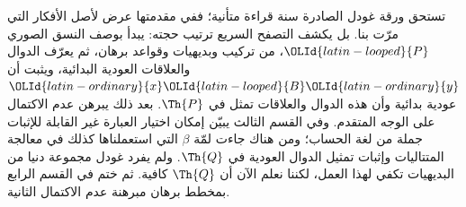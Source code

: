 \documentclass[../../../include/open-logic-section]{subfiles}
\begin{document}


تستحق ورقة غودل الصادرة سنة  قراءة متأنية؛ ففي مقدمتها عرض
لأصل الأفكار التي مرّت بنا. بل يكشف التصفح السريع ترتيب حجته:
يبدأ بوصف النسق الصوري $\OLId{latin-looped}{P}$، من تركيب وبديهيات وقواعد برهان،
ثم يعرّف الدوال والعلاقات العودية البدائية، ويثبت أن $\OLId{latin-ordinary}{x} \OLId{latin-looped}{B} \OLId{latin-ordinary}{y}$
عودية بدائية وأن هذه الدوال والعلاقات تمثل في $\Th{P}$.
بعد ذلك يبرهن عدم الاكتمال على الوجه المتقدم. وفي القسم الثالث
يبيّن إمكان اختيار العبارة غير القابلة للإثبات جملة من لغة الحساب؛
ومن هناك جاءت لمّة $\beta$ التي استعملناها كذلك في معالجة
المتتاليات وإثبات تمثيل الدوال العودية في $\Th{Q}$.
ولم يفرد غودل مجموعة دنيا من البديهيات تكفي لهذا العمل، لكننا
نعلم الآن أن $\Th{Q}$ كافية. ثم ختم في القسم الرابع بمخطط
برهان مبرهنة عدم الاكتمال الثانية.
\end{document}
